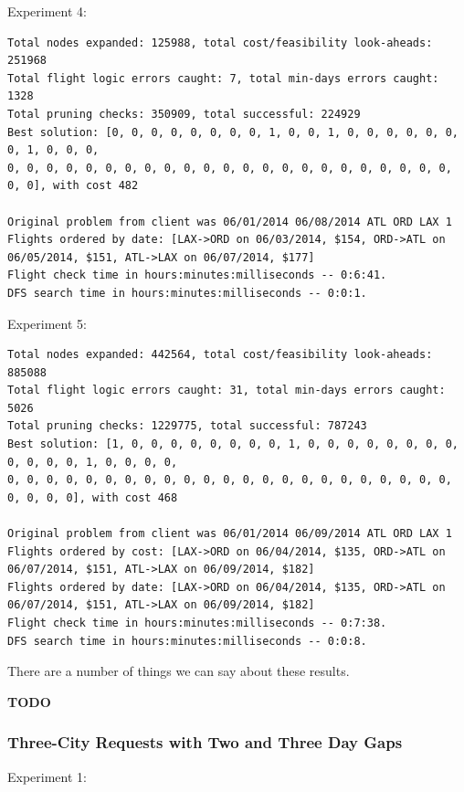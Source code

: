 \documentclass{article}
\begin{document}
Experiment 4:

\scriptsize
\begin{verbatim}
Total nodes expanded: 125988, total cost/feasibility look-aheads: 251968
Total flight logic errors caught: 7, total min-days errors caught: 1328
Total pruning checks: 350909, total successful: 224929
Best solution: [0, 0, 0, 0, 0, 0, 0, 0, 1, 0, 0, 1, 0, 0, 0, 0, 0, 0, 0, 1, 0, 0, 0,
0, 0, 0, 0, 0, 0, 0, 0, 0, 0, 0, 0, 0, 0, 0, 0, 0, 0, 0, 0, 0, 0, 0, 0, 0], with cost 482

Original problem from client was 06/01/2014 06/08/2014 ATL ORD LAX 1
Flights ordered by date: [LAX->ORD on 06/03/2014, $154, ORD->ATL on 06/05/2014, $151, ATL->LAX on 06/07/2014, $177]
Flight check time in hours:minutes:milliseconds -- 0:6:41.
DFS search time in hours:minutes:milliseconds -- 0:0:1.
\end{verbatim}
\normalsize

Experiment 5:

\scriptsize
\begin{verbatim}
Total nodes expanded: 442564, total cost/feasibility look-aheads: 885088
Total flight logic errors caught: 31, total min-days errors caught: 5026
Total pruning checks: 1229775, total successful: 787243
Best solution: [1, 0, 0, 0, 0, 0, 0, 0, 0, 1, 0, 0, 0, 0, 0, 0, 0, 0, 0, 0, 0, 0, 1, 0, 0, 0, 0,
0, 0, 0, 0, 0, 0, 0, 0, 0, 0, 0, 0, 0, 0, 0, 0, 0, 0, 0, 0, 0, 0, 0, 0, 0, 0, 0], with cost 468

Original problem from client was 06/01/2014 06/09/2014 ATL ORD LAX 1
Flights ordered by cost: [LAX->ORD on 06/04/2014, $135, ORD->ATL on 06/07/2014, $151, ATL->LAX on 06/09/2014, $182]
Flights ordered by date: [LAX->ORD on 06/04/2014, $135, ORD->ATL on 06/07/2014, $151, ATL->LAX on 06/09/2014, $182]
Flight check time in hours:minutes:milliseconds -- 0:7:38.
DFS search time in hours:minutes:milliseconds -- 0:0:8.
\end{verbatim}
\normalsize

There are a number of things we can say about these results.

{\bf TODO}

\subsubsection{Three-City Requests with Two and Three Day Gaps}

Experiment 1:
\end{document}
